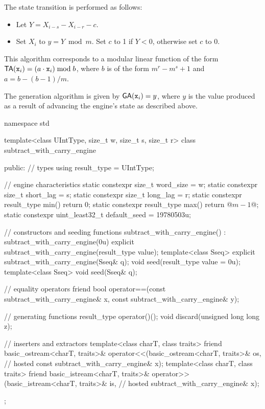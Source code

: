 \pnum
The state transition
is performed as follows:
\begin{itemize}
 \item
   Let $Y = X_{i-s} - X_{i-r} - c$.
 \item
   Set $X_i$ to $y = Y \bmod m$.
   Set $c$ to 1 if $Y < 0$,
   otherwise set $c$ to 0.
\end{itemize}
\begin{note}
 This algorithm corresponds
 to a modular linear function
 of the form
 $\mathsf{TA}(\state{x}{i}) = (a \cdot \state{x}{i}) \bmod b$,
 where $b$ is of the form
 $m^r - m^s + 1$
 and $a = b - (b - 1) / m$.
\end{note}

\pnum
The generation algorithm
is given by $\mathsf{GA}(\state{x}{i}) = y$,
where $y$ is the value produced as a result
of advancing the engine's state as described above.

%
%
\begin{codeblock}
namespace std {
  template<class UIntType, size_t w, size_t s, size_t r>
  class subtract_with_carry_engine {
  public:
    // types
    using result_type = UIntType;

    // engine characteristics
    static constexpr size_t word_size = w;
    static constexpr size_t short_lag = s;
    static constexpr size_t long_lag = r;
    static constexpr result_type min() { return 0; }
    static constexpr result_type max() { return @$m - 1$@; }
    static constexpr uint_least32_t default_seed = 19780503u;

    // constructors and seeding functions
    subtract_with_carry_engine() : subtract_with_carry_engine(0u) {}
    explicit subtract_with_carry_engine(result_type value);
    template<class Sseq> explicit subtract_with_carry_engine(Sseq& q);
    void seed(result_type value = 0u);
    template<class Sseq> void seed(Sseq& q);

    // equality operators
    friend bool operator==(const subtract_with_carry_engine& x,
                           const subtract_with_carry_engine& y);

    // generating functions
    result_type operator()();
    void discard(unsigned long long z);

    // inserters and extractors
    template<class charT, class traits>
      friend basic_ostream<charT, traits>&
        operator<<(basic_ostream<charT, traits>& os,            // hosted
                   const subtract_with_carry_engine& x);
    template<class charT, class traits>
      friend basic_istream<charT, traits>&
        operator>>(basic_istream<charT, traits>& is,            // hosted
                   subtract_with_carry_engine& x);
  };
}
\end{codeblock}

